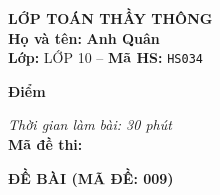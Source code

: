 \noindent
\begin{tcolorbox}[colback=white,colframe=black,arc=0mm,boxrule=0.8pt,top=4pt,bottom=4pt,left=6pt,right=6pt]
	\begin{minipage}[c]{0.44\textwidth}
		{\bfseries\large LỚP TOÁN THẦY THÔNG}\\[3pt]
		\textbf{Họ và tên:} \textbf{\large Anh Quân}\\[3pt]
		\textbf{Lớp:} LỚP 10 \quad -- \quad \textbf{Mã HS:} \texttt{HS034}
	\end{minipage}
	\hfill
	\begin{minipage}[c]{0.22\textwidth}
		\begin{tcolorbox}[colback=white,colframe=black,arc=0mm,boxrule=0.6pt,height=1.8cm,halign=center,valign=top,top=2pt]
			{\bfseries\normalsize Điểm}
		\end{tcolorbox}
	\end{minipage}
	\hfill
	\begin{minipage}[c]{0.30\textwidth}
		\raggedleft
		\textit{Thời gian làm bài: 30 phút}\\[4pt]
		\textbf{Mã đề thi:} 
	\end{minipage}
\end{tcolorbox}
\vspace{0.25cm}

\noindent\textbf{\large ĐỀ BÀI (MÃ ĐỀ: 009)}
\vspace{0.1cm}

